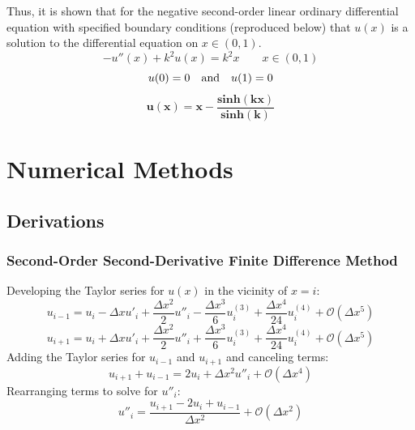 \documentclass[10pt, reqno]{article}		%
\numberwithin{equation}{section}
\begin{document}
Thus, it is shown that for the negative second-order linear ordinary differential equation with specified boundary conditions (reproduced below) that $u(x)$ is a solution to the differential equation on $x \in (0, 1)$.
\begin{equation}
-u''(x)+k^2u(x)=k^2x \qquad x \in (0, 1)
\end{equation}
\begin{equation}
u(0) = 0 \quad \textnormal{and} \quad u(1) = 0 
\end{equation}
\begin{equation}
\mathbf{u(x) = x - \frac{sinh(kx)}{sinh(k)}}
\end{equation}

\newpage

\section{Numerical Methods}

\subsection{Derivations}

\subsubsection{Second-Order Second-Derivative Finite Difference Method}

Developing the Taylor series for $u(x)$ in the vicinity of $x = i$:
\begin{equation}
u_{i-1} = u_i - \Delta x u'_i + \frac{\Delta x^2}{2} u''_i - \frac{\Delta x^3}{6} u^{(3)}_i + \frac{\Delta x^4}{24} u^{(4)}_i + \mathcal{O}(\Delta x^5)
\end{equation}
\begin{equation}
u_{i+1} = u_i + \Delta x u'_i + \frac{\Delta x^2}{2} u''_i + \frac{\Delta x^3}{6} u^{(3)}_i + \frac{\Delta x^4}{24} u^{(4)}_i + \mathcal{O}(\Delta x^5)
\end{equation}
Adding the Taylor series for $u_{i-1}$ and $u_{i+1}$ and canceling terms:
\begin{equation}
u_{i+1} + u_{i-1} = 2u_i + \Delta x^2 u''_i + \mathcal{O}(\Delta x^4)
\end{equation}
Rearranging terms to solve for $u''_i$:
\begin{equation}
u''_i = \frac{u_{i+1} - 2u_i + u_{i-1}}{\Delta x^2} + \mathcal{O}(\Delta x^2) 
\end{equation}
\end{document}
